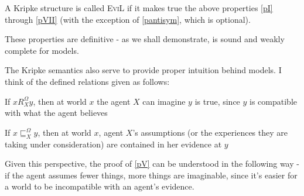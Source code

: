 \begin{definition}
A Kripke structure is called \textsc{EviL} if it makes true the
  above properties \ref{pI} through \ref{pVII} (with the exception of \ref{pantisym}, which is optional).
\end{definition}

These properties are definitive - as we shall demonstrate,  is
sound and weakly complete for  models.

The Kripke semantics also serve to provide proper intuition behind
 models. I think of the defined relations given as follows:
\begin{itemizedot}
  \item If $x R^{\Omega}_X y$, then at world $x$ the agent $X$ can imagine $y$
  is true, since $y$ is compatible with what the agent believes 
  \item If $x \sqsubseteq^{\Omega}_X y$, then at world $x$, agent $X$'s
  assumptions (or the experiences they are taking under consideration) are
  contained in her evidence at $y$
\end{itemizedot}
Given this perspective, the proof of \ref{pV} can be understood in the
following way - if the agent assumes fewer things, more things are imaginable,
since it's easier for a world to be incompatible with an agent's evidence.

